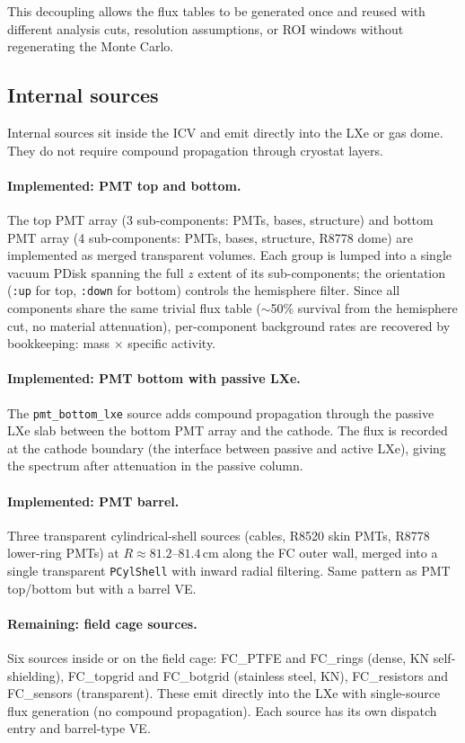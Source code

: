 \documentclass[11pt]{article}
\begin{document}
This decoupling allows the flux tables to be generated once and reused with
different analysis cuts, resolution assumptions, or ROI windows without
regenerating the Monte Carlo.

\subsection{Internal sources}

Internal sources sit inside the ICV and emit directly into the LXe or gas
dome. They do not require compound propagation through cryostat layers.

\paragraph{Implemented: PMT top and bottom.}
The top PMT array (3 sub-components: PMTs, bases, structure) and bottom PMT
array (4 sub-components: PMTs, bases, structure, R8778 dome) are implemented
as merged transparent volumes. Each group is lumped into a single vacuum PDisk
spanning the full $z$ extent of its sub-components; the orientation (\texttt{:up}
for top, \texttt{:down} for bottom) controls the hemisphere filter. Since all
components share the same trivial flux table ($\sim$50\% survival from the
hemisphere cut, no material attenuation), per-component background rates are
recovered by bookkeeping: mass $\times$ specific activity.

\paragraph{Implemented: PMT bottom with passive LXe.}
The \texttt{pmt\_bottom\_lxe} source adds compound propagation through the
passive LXe slab between the bottom PMT array and the cathode. The flux is
recorded at the cathode boundary (the interface between passive and active LXe),
giving the spectrum after attenuation in the passive column.

\paragraph{Implemented: PMT barrel.}
Three transparent cylindrical-shell sources (cables, R8520 skin PMTs,
R8778 lower-ring PMTs) at $R \approx 81.2$--$81.4$\,cm along the FC outer
wall, merged into a single transparent \texttt{PCylShell} with inward radial
filtering. Same pattern as PMT top/bottom but with a barrel VE.

\paragraph{Remaining: field cage sources.}
Six sources inside or on the field cage: FC\_PTFE and FC\_rings (dense, KN
self-shielding), FC\_topgrid and FC\_botgrid (stainless steel, KN),
FC\_resistors and FC\_sensors (transparent). These emit directly into the LXe
with single-source flux generation (no compound propagation). Each source has
its own dispatch entry and barrel-type VE.
\end{document}
